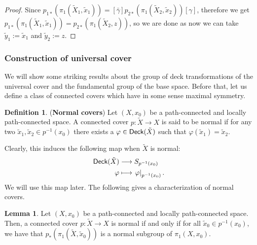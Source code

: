 \documentclass[letterpaper,11pt,twoside]{article}
\theoremstyle{definition}
\theoremstyle{definition}
\newtheorem{definition}[proposition]{Definition}
\theoremstyle{definition}
\theoremstyle{definition}
\newtheorem{lemma}[proposition]{\textbf{Lemma}}
\theoremstyle{definition}
\theoremstyle{definition}
\theoremstyle{remark}
\theoremstyle{definition}
\newcommand{\rest}[2]{\left. { #1 }\right \vert_{#2}}
\newcommand{\Deck}[1]{{\fontfamily{lmss}\selectfont 
		\text{Deck}(#1)
}}
\begin{document}
\begin{proof}
	Since $ 	p_{1*}(\pi_1(\tilde{X}_1,\tilde{x}_1)) = [\bar{\gamma}] p_{2*}(\pi_1(\tilde{X}_2,\tilde{x}_2))  [\gamma] $, therefore we get $ p_{1*}(\pi_1(\tilde{X}_1,\tilde{x}_1))= p_{2*}(\pi_1(\tilde{X}_2,z))  $, so we are done as now we can take $ \tilde{y}_1:= \tilde{x}_1 $ and $ \tilde{y}_2:= z $.
\end{proof}
\subsubsection{Construction of universal cover}
We will show some striking results about the group of deck transformations of the universal cover and the fundamental group of the base space. Before that, let us define a class of connected covers which have in some sense maximal symmetry.
\begin{definition}
	(\textbf{Normal covers}) Let $ (X,x_0) $ be a path-connected and locally path-connected space. A connected cover $ p : \tilde{X} \to X $ is said to be normal if for any two $ \tilde{x}_1,\tilde{x}_2 \in p^{-1}(x_0) $ there exists a $ \varphi \in \Deck{\tilde{X}} $ such that $ \varphi(\tilde{x}_1) = \tilde{x}_2 $.
\end{definition}
Clearly, this induces the following map when $ \tilde{X} $ is normal:
\begin{align*}
	\Deck{\tilde{X}} &\longrightarrow S_{p^{-1}(x_0)}\\
	\varphi &\longmapsto \rest{\varphi}{p^{-1}(x_0)}.
\end{align*} 
We will use this map later. The following gives a characterization of normal covers.
\begin{lemma}
	Let $ (X,x_0) $ be a path-connected and locally path-connected space. Then, a connected cover $ p : \tilde{X} \to X $ is normal if and only if for all $ \tilde{x}_0 \in p^{-1}(x_{0}) $, we have that $ p_{*}(\pi_1(\tilde{X},\tilde{x}_0)) $ is a normal subgroup of $ \pi_1(X,x_0) $.
\end{lemma}
\end{document}
